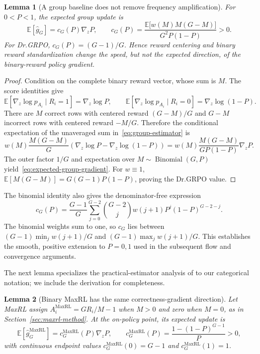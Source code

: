 \documentclass{article}
\newcommand{\1}{\mathbf 1}
\newcommand{\E}{\mathbb E}
\newtheorem{lemma}{Lemma}[section]
\theoremstyle{remark}
\theoremstyle{definition}
\theoremstyle{plain}
\begin{document}
\begin{lemma}[A group baseline does not remove frequency amplification]
\label{lem:grpo-mean}
For $0<P<1$, the expected group update is
\begin{equation}
  \E[\widehat g_G]
  =c_G(P)\nabla_z P,
  \qquad
  c_G(P)=
  \frac{\E\!\big[w(M)M(G-M)\big]}{G^2P(1-P)}>0.
  \label{eq:expected-group-gradient}
\end{equation}
For Dr.GRPO, $c_G(P)=(G-1)/G$. Hence reward centering and binary reward
standardization change the speed, but not the expected direction, of the
binary-reward policy gradient.
\end{lemma}

\begin{proof}
Condition on the complete binary reward vector, whose sum is $M$. The score
identities give
\[
  \E[\nabla_z\log p_{A_i}\mid R_i=1]=\nabla_z\log P,
  \qquad
  \E[\nabla_z\log p_{A_i}\mid R_i=0]
  =\nabla_z\log(1-P).
\]
There are $M$ correct rows with centered reward $(G-M)/G$ and $G-M$
incorrect rows with centered reward $-M/G$. Therefore the conditional
expectation of the unaveraged sum in~\eqref{eq:group-estimator} is
\[
  w(M)\frac{M(G-M)}{G}
  \left(\nabla_z\log P-\nabla_z\log(1-P)\right)
  =w(M)\frac{M(G-M)}{GP(1-P)}\nabla_zP.
\]
The outer factor $1/G$ and expectation over
$M\sim\operatorname{Binomial}(G,P)$ yield~\eqref{eq:expected-group-gradient}.
For $w\equiv1$,
$\E[M(G-M)]=G(G-1)P(1-P)$, proving the Dr.GRPO value.
\end{proof}

The binomial identity also gives the denominator-free expression
\[
 c_G(P)=\frac{G-1}{G}\sum_{j=0}^{G-2}\binom{G-2}{j}
 w(j+1)P^j(1-P)^{G-2-j}.
\]
The binomial weights sum to one, so $c_G$ lies between
$(G-1)\min_j w(j+1)/G$ and $(G-1)\max_j w(j+1)/G$.
This establishes the smooth, positive extension to $P=0,1$ used in the
subsequent flow and convergence arguments.

The next lemma specializes the practical-estimator analysis of
\citet[Section~4.3 and Appendix~D, Theorem~5]{tajwar2026maxrl}
to our categorical notation; we include the derivation for completeness.

\begin{lemma}[Binary MaxRL has the same correctness-gradient direction]
\label{lem:maxrl-mean}
Let MaxRL assign
$A_i^{\mathrm{MaxRL}}=GR_i/M-1$ when $M>0$ and zero when $M=0$, as in
Section~\ref{sec:maxrl-method}. At the on-policy point, its expected update is
\begin{equation}
  \E[\widehat g_G^{\mathrm{MaxRL}}]
  =c_G^{\mathrm{MaxRL}}(P)\nabla_zP,
  \qquad
  c_G^{\mathrm{MaxRL}}(P)
  =\frac{1-(1-P)^{G-1}}{P}>0,
  \label{eq:maxrl-expected-gradient}
\end{equation}
with continuous endpoint values
$c_G^{\mathrm{MaxRL}}(0)=G-1$ and
$c_G^{\mathrm{MaxRL}}(1)=1$.
\end{lemma}
\end{document}
